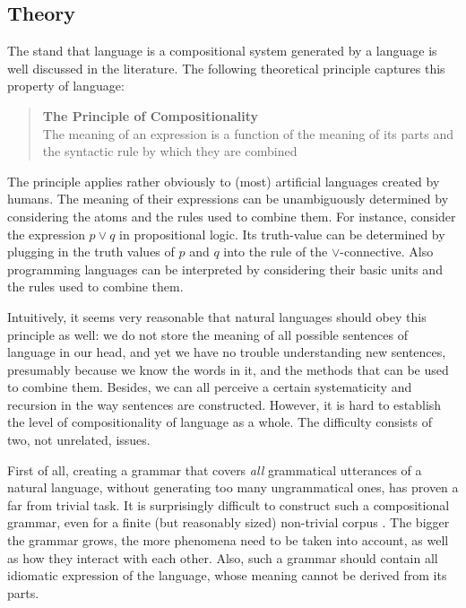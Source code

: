 \documentclass{report}
\theoremstyle{definition}
\theoremstyle{plain}
\begin{document}
\subsection{Theory}

The stand that language is a compositional system generated by a language is well discussed in the literature. The following theoretical principle captures this property of language:

\begin{quote}
\textbf{The Principle of Compositionality}\\
The meaning of an expression is a function of the meaning of its parts and the syntactic rule by which they are combined \citep{partee1984compositionality}
\end{quote}

The principle applies rather obviously to (most) artificial languages created by humans. The meaning of their expressions can be unambiguously determined by considering the atoms and the rules used to combine them. For instance, consider the expression $p\lor q$ in propositional logic. Its truth-value can be determined by plugging in the truth values of $p$ and $q$ into the rule of the $\lor$-connective. Also programming languages can be interpreted by considering their basic units and the rules used to combine them.

Intuitively, it seems very reasonable that natural languages should obey this principle as well: we do not store the meaning of all possible sentences of language in our head, and yet we have no trouble understanding new sentences, presumably because we know the words in it, and the methods that can be used to combine them. Besides, we can all perceive a certain systematicity and recursion in the way sentences are constructed. However, it is hard to establish the level of compositionality of language as a whole. The difficulty consists of two, not unrelated, issues.

First of all, creating a grammar that covers \textit{all} grammatical utterances of a natural language, without generating too many ungrammatical ones, has proven a far from trivial task. It is surprisingly difficult to construct such a compositional grammar, even for a finite (but reasonably sized) non-trivial corpus \citep{scha1990taaltheorie}. The bigger the grammar grows, the more phenomena need to be taken into account, as well as how they interact with each other. Also, such a grammar should contain all idiomatic expression of the language, whose meaning cannot be derived from its parts.
\end{document}
